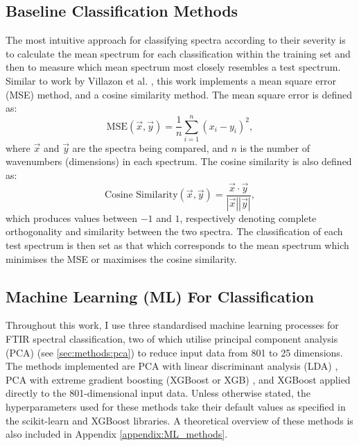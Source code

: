 \subsection{Baseline Classification Methods}
\label{sec:methods:baseline_classification}
The most intuitive approach for classifying spectra according to their severity is to calculate the mean spectrum for each classification within the training set and then to measure which mean spectrum most closely resembles a test spectrum. Similar to work by Villazon et al. \cite{villazon_cancer_2025}, this work implements a mean square error (MSE) method, and a cosine similarity method. The mean square error is defined as:
\begin{equation}
    \text{MSE}(\vec x,\vec y) = \frac{1}{n} \sum_{i=1}^{n} (x_i - y_i)^2,
\end{equation}
where $\vec x$ and $\vec y$ are the spectra being compared, and $n$ is the number of wavenumbers (dimensions) in each spectrum. The cosine similarity is also defined as:
\begin{equation}
    \text{Cosine Similarity}(\vec x, \vec y) = \frac{\vec x \cdot \vec y}{|\vec x| |\vec y|},
\end{equation}
which produces values between $-1$ and $1$, respectively denoting complete orthogonality and similarity between the two spectra. The classification of each test spectrum is then set as that which corresponds to the mean spectrum which minimises the MSE or maximises the cosine similarity.

\subsection{Machine Learning (ML) For Classification}
\label{sec:methods:trad_ML_usage}
Throughout this work, I use three standardised machine learning processes for FTIR spectral classification, two of which utilise principal component analysis (PCA) (see \ref{sec:methods:pca}) to reduce input data from 801 to 25 dimensions. The methods implemented are PCA with linear discriminant analysis (LDA) \cite{fisher_use_1936,ghojogh_linear_2019}, PCA with extreme gradient boosting (XGBoost or XGB) \cite{chen_xgboost_2016}, and XGBoost applied directly to the 801-dimensional input data. Unless otherwise stated, the hyperparameters used for these methods take their default values as specified in the scikit-learn \cite{pedregosa_scikit-learn_2011} and XGBoost \cite{chen_xgboost_2016} libraries. A theoretical overview of these methods is also included in Appendix \ref{appendix:ML_methods}. \\ 

